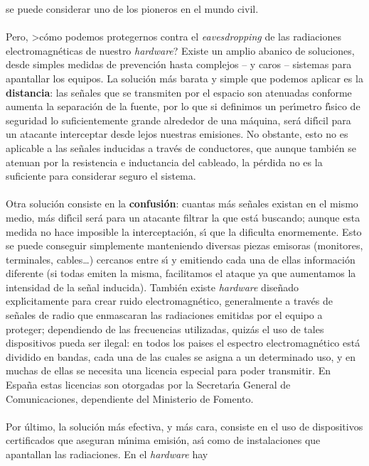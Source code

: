 se puede considerar uno de los pioneros en el mundo civil.\\
\\Pero, >c\'omo podemos protegernos contra el {\it eavesdropping} de las
radiaciones electromagn\'eticas de nuestro {\it hardware}? Existe un amplio 
abanico de soluciones, desde simples medidas de prevenci\'on hasta complejos 
-- y caros -- sistemas para apantallar los equipos. La soluci\'on m\'as barata
y simple que podemos aplicar es la {\bf distancia}: las se\~nales que se 
transmiten por el espacio son atenuadas conforme aumenta la separaci\'on de la
fuente, por lo que si definimos un per\'{\i}metro f\'{\i}sico de seguridad 
lo suficientemente grande alrededor de una m\'aquina, ser\'a dif\'{\i}cil para 
un atacante interceptar desde lejos nuestras emisiones. No obstante, esto no
es aplicable a las se\~nales inducidas a trav\'es de conductores, que aunque
tambi\'en se atenuan por la resistencia e inductancia del cableado, la p\'erdida
no es la suficiente para considerar seguro el sistema.\\ 
\\Otra soluci\'on consiste en la {\bf confusi\'on}: cuantas m\'as se\~nales
existan en el mismo medio, m\'as dif\'{\i}cil ser\'a para un atacante filtrar
la que est\'a buscando; aunque esta medida no hace imposible la 
interceptaci\'on, s\'{\i} que la dificulta enormemente. Esto se puede conseguir
simplemente manteniendo diversas piezas emisoras (monitores, terminales, 
cables\ldots) cercanos entre s\'{\i} y emitiendo cada una de ellas informaci\'on
diferente (si todas emiten la misma, facilitamos el ataque ya que aumentamos
la intensidad de la se\~nal inducida). Tambi\'en existe {\it hardware} 
dise\~nado expl\'{\i}citamente para crear ruido electromagn\'etico, generalmente
a trav\'es de se\~nales de radio que enmascaran las radiaciones emitidas por
el equipo a proteger; dependiendo de las frecuencias utilizadas, quiz\'as el
uso de tales dispositivos pueda ser ilegal: en todos los paises el
espectro electromagn\'etico est\'a dividido en bandas, cada una de las cuales
se asigna a un determinado uso, y en muchas de ellas se necesita una licencia
especial para poder transmitir. En Espa\~na estas licencias son otorgadas por
la Secretar\'{\i}a General de Comunicaciones, dependiente del Ministerio de
Fomento.\\
\\Por \'ultimo, la soluci\'on m\'as efectiva, y m\'as cara, consiste en el
uso de dispositivos certificados que aseguran m\'{\i}nima emisi\'on, as\'{\i}
como de instalaciones que apantallan las radiaciones. En el {\it hardware} hay
